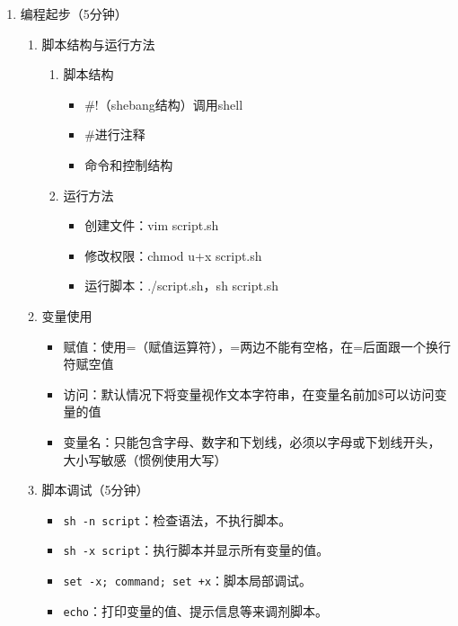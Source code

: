 \documentclass{TIJMUjiaoanSY}
\begin{document}

\firstTail


\newpage
\otherHeader

\noindent
\begin{enumerate}
  \item 编程起步（5分钟）
    \begin{enumerate}
      \item 脚本结构与运行方法
	\vspace*{-10pt}
	\begin{multicols}{2}
	\begin{enumerate}
	  \item 脚本结构
	    \begin{itemize}
	      \item \#!（shebang结构）调用shell
	      \item \#进行注释
	      \item 命令和控制结构
	    \end{itemize}
	  \item 运行方法
	    \begin{itemize}
	      \item 创建文件：vim script.sh
	      \item 修改权限：chmod u+x script.sh
	      \item 运行脚本：./script.sh，sh script.sh
	    \end{itemize}
	\end{enumerate}
	\end{multicols}
	\vspace*{-10pt}
      \item 变量使用
	\begin{itemize}
	  \item 赋值：使用=（赋值运算符），=两边不能有空格，在=后面跟一个换行符赋空值
	  \item 访问：默认情况下将变量视作文本字符串，在变量名前加\$可以访问变量的值
	  \item 变量名：只能包含字母、数字和下划线，必须以字母或下划线开头，大小写敏感（惯例使用大写）
	\end{itemize}
  \item 脚本调试（5分钟）
    \begin{itemize}
      \item \verb|sh -n script|：检查语法，不执行脚本。
      \item \verb|sh -x script|：执行脚本并显示所有变量的值。
      \item \verb|set -x; command; set +x|：脚本局部调试。
      \item \verb|echo|：打印变量的值、提示信息等来调剂脚本。
    \end{itemize}
    \end{enumerate}


\end{enumerate}
\end{document}
